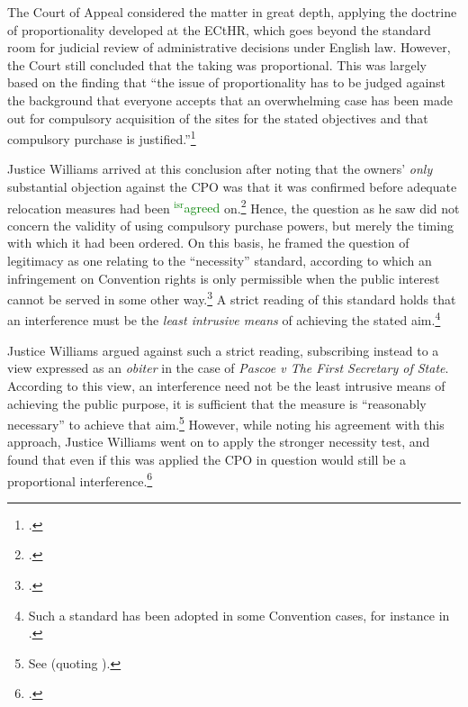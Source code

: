 \documentclass[12pt,a4paper]{book} %
\newcommand{\isr}[1]{\textcolor{green}{$^{\textrm{isr}}${#1}}}
\begin{document}
The Court of Appeal considered the matter in great depth, applying the doctrine of proportionality developed at the ECtHR, which goes beyond the standard room for judicial review of administrative decisions under English law. However, the Court still concluded that the taking was proportional. This was largely based on the finding that ``the issue of proportionality has to be judged against the background that everyone accepts that an overwhelming case has been made out for compulsory acquisition of the sites for the stated objectives and that compulsory purchase is justified.''\footcite[42]{smith08} 

Justice Williams arrived at this conclusion after noting that the owners' {\it only} substantial objection against the CPO was that it was confirmed before adequate relocation measures had been \isr{agreed} on.\footcite[42]{smith08} Hence, the question as he saw did not concern the validity of using compulsory purchase powers, but merely the timing with which it had been ordered. On this basis, he framed the question of legitimacy as one relating to the ``necessity'' standard, according to which an infringement on Convention rights is only permissible when the public interest cannot be served in some other way.\footcite[43]{smith08} A strict reading of this standard holds that an interference must be the {\it least intrusive means} of achieving the stated aim.\footnote{Such a standard has been adopted in some Convention cases, for instance in \cite{samaroo01}.}

Justice Williams argued against such a strict reading, subscribing instead to a view expressed as an {\it obiter} in the case of {\it Pascoe v The First Secretary of State}. According to this view, an interference need not be the least intrusive means of achieving the public purpose, it is sufficient that the measure is ``reasonably necessary'' to achieve that aim.\footnote{See \cite[74-75]{pascoe06} (quoting \cite[25]{clay04}).} However, while noting his agreement with this approach, Justice Williams went on to apply the stronger necessity test, and found that even if this was applied the CPO in question would still be a proportional interference.\footcite[41-50]{smith08}
\end{document}
